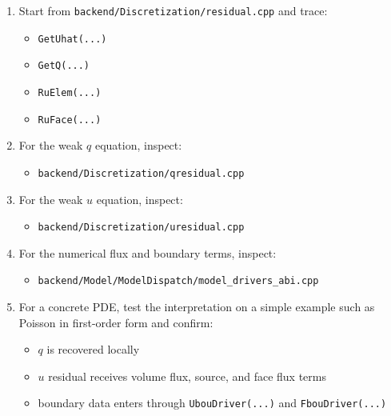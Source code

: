 \documentclass[11pt]{article}
\begin{document}
\begin{enumerate}[leftmargin=*]
\item Start from \texttt{backend/Discretization/residual.cpp} and trace:
\begin{itemize}[leftmargin=*]
\item \texttt{GetUhat(...)}
\item \texttt{GetQ(...)}
\item \texttt{RuElem(...)}
\item \texttt{RuFace(...)}
\end{itemize}
\item For the weak $q$ equation, inspect:
\begin{itemize}[leftmargin=*]
\item \texttt{backend/Discretization/qresidual.cpp}
\end{itemize}
\item For the weak $u$ equation, inspect:
\begin{itemize}[leftmargin=*]
\item \texttt{backend/Discretization/uresidual.cpp}
\end{itemize}
\item For the numerical flux and boundary terms, inspect:
\begin{itemize}[leftmargin=*]
\item \texttt{backend/Model/ModelDispatch/model\_drivers\_abi.cpp}
\end{itemize}
\item For a concrete PDE, test the interpretation on a simple example such as
Poisson in first-order form and confirm:
\begin{itemize}[leftmargin=*]
\item $q$ is recovered locally
\item $u$ residual receives volume flux, source, and face flux terms
\item boundary data enters through \texttt{UbouDriver(...)} and
\texttt{FbouDriver(...)}
\end{itemize}
\end{enumerate}
\end{document}
